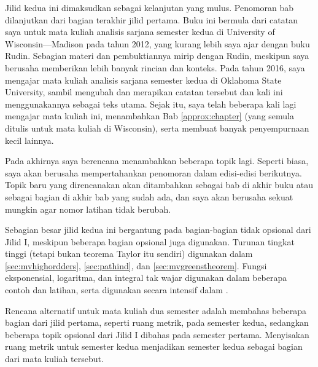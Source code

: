 
Jilid kedua  ini dimaksudkan sebagai kelanjutan yang
mulus. Penomoran bab dilanjutkan dari bagian terakhir jilid pertama. Buku ini
bermula dari catatan saya untuk mata kuliah analisis sarjana semester kedua di
University of Wisconsin---Madison pada tahun 2012, yang kurang lebih saya ajar
dengan buku Rudin. Sebagian materi dan pembuktiannya mirip dengan Rudin,
meskipun saya berusaha memberikan lebih banyak rincian dan konteks.
Pada tahun 2016, saya mengajar mata kuliah analisis sarjana semester kedua di
Oklahoma State University, sambil mengubah dan merapikan catatan tersebut dan
kali ini menggunakannya sebagai teks utama. Sejak itu, saya telah beberapa kali
lagi mengajar mata kuliah ini, menambahkan Bab \ref{approx:chapter} (yang semula
ditulis untuk mata kuliah di Wisconsin), serta membuat banyak penyempurnaan
kecil lainnya.

Pada akhirnya saya berencana menambahkan beberapa topik lagi.
Seperti biasa, saya akan berusaha mempertahankan penomoran dalam edisi-edisi
berikutnya. Topik baru yang direncanakan akan ditambahkan sebagai bab di akhir
buku atau sebagai bagian di akhir bab yang sudah ada, dan saya akan berusaha
sekuat mungkin agar nomor latihan tidak berubah.

Sebagian besar jilid kedua ini bergantung pada bagian-bagian tidak opsional dari
Jilid I\@, meskipun beberapa bagian opsional juga digunakan.
Turunan tingkat tinggi (tetapi bukan teorema Taylor itu sendiri) digunakan
dalam \ref{sec:mvhighordders}, \ref{sec:pathind}, dan
\ref{sec:mvgreenstheorem}. Fungsi eksponensial, logaritma, dan integral tak wajar
digunakan dalam beberapa contoh dan latihan, serta digunakan secara intensif
dalam .

Rencana alternatif untuk mata kuliah dua semester adalah membahas beberapa
bagian dari jilid pertama, seperti ruang metrik, pada semester kedua, sedangkan
beberapa topik opsional dari Jilid I dibahas pada semester pertama. Menyisakan
ruang metrik untuk semester kedua menjadikan semester kedua sebagai bagian
 dari mata kuliah tersebut.

